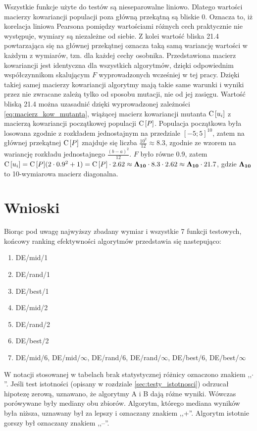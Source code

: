 \documentclass[a4paper,onecolumn,oneside,12pt,wide,floatssmall]{mwrep}
\def\C{{\rm C}\,}
\theoremstyle{definition}
\theoremstyle{plain}%
\theoremstyle{remark}
\begin{document}
Wszystkie funkcje użyte do testów są nieseparowalne liniowo.
Dlatego wartości macierzy kowariancji populacji poza główną przekątną są bliskie 0. Oznacza to,
iż korelacja liniowa Pearsona pomiędzy wartościami różnych cech praktycznie nie występuje, wymiary
są niezależne od siebie. Z kolei wartość bliska 21.4 powtarzająca się na głównej przekątnej 
oznacza taką samą wariancję wartości w każdym z wymiarów, tzn. dla każdej cechy osobnika.
Przedstawiona macierz kowariancji jest identyczna dla wszystkich algorytmów, 
dzięki odpowiednim współczynnikom skalującym
$F$ wyprowadzonych wcześniej w tej pracy. Dzięki takiej samej macierzy kowariancji algorytmy
mają takie same warunki i wyniki przez nie zwracane zależą tylko od sposobu mutacji, nie od jej
zasięgu. 
Wartość bliską 21.4 można uzasadnić dzięki wyprowadzonej zależności \eqref{eq:macierz_kow_mutanta},
wiążącej macierz kowariancji mutanta $\C[u_i]$
z macierzą kowariancji początkowej populacji $\C[P]$. Populacja początkowa była losowana zgodnie z 
rozkładem jednostajnym na przedziale $[-5;5]^{10}$, zatem na głównej przekątnej $\C[P]$
znajduje się liczba $\frac{10^2}{12} \approx 8.3$, zgodnie ze wzorem na wariancję rozkładu jednostajnego 
$\frac{(b - a)^2}{12}$. $F$ było równe 0.9, zatem 
$\C[u_i] = \C[P](2 \cdot 0.9^2 + 1) = \C[P] \cdot 2.62 \approx \bold{\Lambda_{10}} \cdot 8.3 \cdot 2.62 \approx \bold{\Lambda_{10}} \cdot 21.7$, gdzie $\bold{\Lambda_{10}}$
to 10-wymiarowa macierz diagonalna. 

\section{Wnioski}

Biorąc pod uwagę najwyższy zbadany wymiar i wszystkie 7 funkcji testowych,
końcowy ranking efektywności algorytmów przedstawia się 
nastepująco:

\begin{enumerate}
 \item DE/mid/1
 \item DE/rand/1
 \item DE/best/1
 \item DE/mid/2
 \item DE/rand/2
 \item DE/best/2
 \item DE/mid/6, DE/mid/$\infty$, DE/rand/6, DE/rand/$\infty$, DE/best/6, DE/best/$\infty$
\end{enumerate}

W notacji stosowanej w tabelach brak statystycznej różnicy oznaczono znakiem ,,$\cdotp$''.
Jeśli test istotności (opisany w rozdziale \ref{sec:testy_istotnosci})
odrzucał hipotezę zerową, uznawano, że algorytmy A i B dają różne wyniki.
Wówczas porówywane były mediany obu zbiorów. Algorytm, którego mediana wyników była niższa,
uznawany był za lepszy i oznaczany znakiem ,,+''. Algorytm istotnie gorszy był oznaczany znakiem ,,--''.
\end{document}
